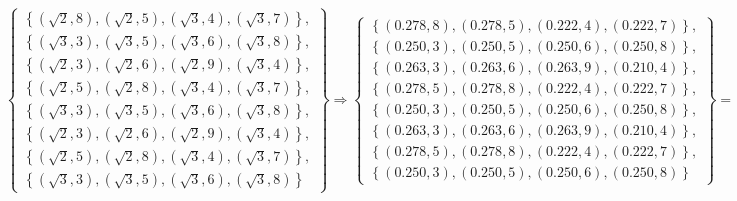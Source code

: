 \begin{equation}
\left\{\begin{array}{c} 
\left\{\left(\sqrt{2},8\right),\left(\sqrt{2},5\right),\left(\sqrt{3},4\right),\left(\sqrt{3},7\right)\right\},\\
\left\{\left(\sqrt{3},3\right),\left(\sqrt{3},5\right),\left(\sqrt{3},6\right),\left(\sqrt{3},8\right)\right\},\\
\left\{\left(\sqrt{2},3\right),\left(\sqrt{2},6\right),\left(\sqrt{2},9\right),\left(\sqrt{3},4\right)\right\},\\
\left\{\left(\sqrt{2},5\right),\left(\sqrt{2},8\right),\left(\sqrt{3},4\right),\left(\sqrt{3},7\right)\right\},\\
\left\{\left(\sqrt{3},3\right),\left(\sqrt{3},5\right),\left(\sqrt{3},6\right),\left(\sqrt{3},8\right)\right\},\\
\left\{\left(\sqrt{2},3\right),\left(\sqrt{2},6\right),\left(\sqrt{2},9\right),\left(\sqrt{3},4\right)\right\},\\
\left\{\left(\sqrt{2},5\right),\left(\sqrt{2},8\right),\left(\sqrt{3},4\right),\left(\sqrt{3},7\right)\right\},\\
\left\{\left(\sqrt{3},3\right),\left(\sqrt{3},5\right),\left(\sqrt{3},6\right),\left(\sqrt{3},8\right)\right\}
\end{array}\right\} \Longrightarrow
\left\{\begin{array}{c} 
\left\{\left(0.278,8\right),\left(0.278,5\right),\left(0.222,4\right),\left(0.222,7\right)\right\},\\
\left\{\left(0.250,3\right),\left(0.250,5\right),\left(0.250,6\right),\left(0.250,8\right)\right\},\\
\left\{\left(0.263,3\right),\left(0.263,6\right),\left(0.263,9\right),\left(0.210,4\right)\right\},\\
\left\{\left(0.278,5\right),\left(0.278,8\right),\left(0.222,4\right),\left(0.222,7\right)\right\},\\
\left\{\left(0.250,3\right),\left(0.250,5\right),\left(0.250,6\right),\left(0.250,8\right)\right\},\\
\left\{\left(0.263,3\right),\left(0.263,6\right),\left(0.263,9\right),\left(0.210,4\right)\right\},\\
\left\{\left(0.278,5\right),\left(0.278,8\right),\left(0.222,4\right),\left(0.222,7\right)\right\},\\
\left\{\left(0.250,3\right),\left(0.250,5\right),\left(0.250,6\right),\left(0.250,8\right)\right\}
\end{array}\right\} = \left\{w_{t}^X\right\}_o
\end{equation}
